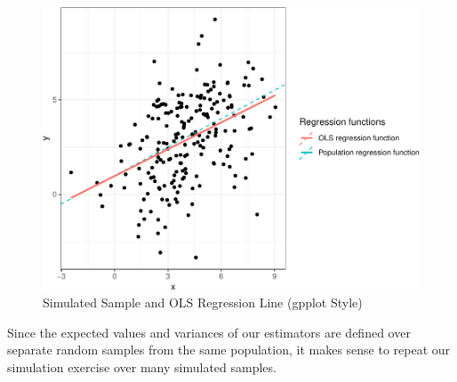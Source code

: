 \documentclass[]{book}
\begin{document}
\begin{figure}

{\centering \includegraphics[width=0.8\linewidth]{MEM5220_R_files/figure-latex/fig6-1} 

}

\caption{Simulated Sample and OLS Regression Line (gpplot Style)}\label{fig:fig6}
\end{figure}

Since the expected values and variances of our estimators are defined
over separate random samples from the same population, it makes sense to
repeat our simulation exercise over many simulated samples.
\end{document}
